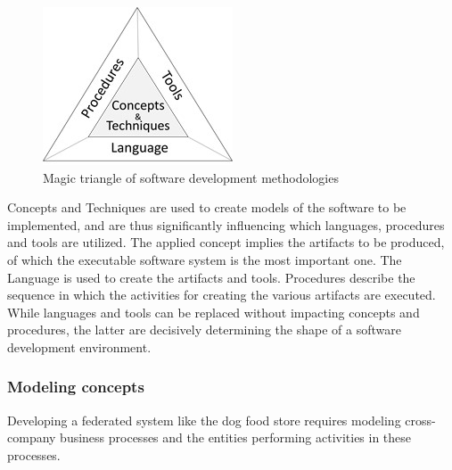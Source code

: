 \begin{figure}[htbp]
	\centering
	\includegraphics[width=0.6\linewidth] {Figures/Chapter5/Project/Triangle.jpg}
	\caption[Magic triangle of software development methodologies]{Magic triangle of software development methodologies}
	\label{fig:Triangle}
\end{figure}

Concepts and Techniques are used to create models of the software to be implemented, and are thus significantly influencing which languages, procedures and tools are utilized. The applied concept implies the artifacts to be produced, of which the executable software system is the most important one. The Language is used to create the artifacts and tools. Procedures describe the sequence in which the activities for creating the various artifacts are executed. While languages and tools can be replaced without impacting concepts and procedures, the latter are decisively determining the shape of a software development environment.
\\
\subsubsection{\textbf{Modeling concepts}}
Developing a federated system like the dog food store requires modeling cross-company business processes and the entities performing activities in these processes.
